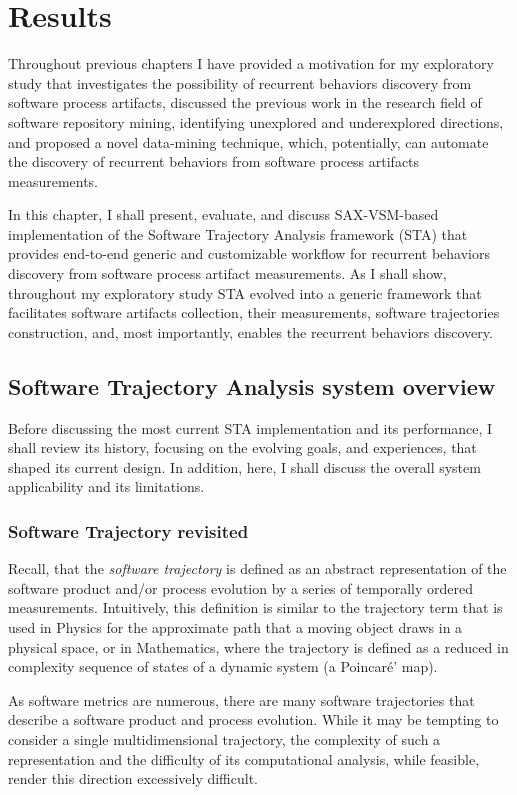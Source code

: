 \chapter{Results}\label{chapter_sta}
Throughout previous chapters I have provided a motivation for my exploratory study that investigates the possibility of recurrent 
behaviors discovery from software process artifacts, discussed the previous work in the research field of software repository mining,
identifying unexplored and underexplored directions, and proposed a novel data-mining technique, which, potentially, can automate 
the discovery of recurrent behaviors from software process artifacts measurements.

In this chapter, I shall present, evaluate, and discuss \mbox{SAX-VSM}-based implementation of the Software Trajectory Analysis 
framework (STA) that provides end-to-end generic and customizable workflow for recurrent behaviors discovery from software process 
artifact measurements. 
As I shall show, throughout my exploratory study STA evolved into a generic framework that facilitates software artifacts 
collection, their measurements, software trajectories construction, and, most importantly, 
enables the recurrent behaviors discovery.

\section{Software Trajectory Analysis system overview}
Before discussing the most current STA implementation and its performance, I shall review its history, focusing on 
the evolving goals, and experiences, that shaped its current design. In addition, here, I shall discuss the overall system
applicability and its limitations.

\subsection{Software Trajectory revisited}
Recall, that the \textit{software trajectory} is defined as an abstract representation of the software product and/or
process evolution by a series of temporally ordered measurements. 
Intuitively, this definition is similar to the trajectory term that is used in Physics for the 
approximate path that a moving object draws in a physical space, or in Mathematics, where the trajectory is defined as a reduced 
in complexity sequence of states of a dynamic system (a Poincar\'{e}' map).

As software metrics are numerous, there are many software trajectories that describe a software product and process 
evolution. While it may be tempting to consider a single multidimensional trajectory, the complexity of such a representation 
and the difficulty of its computational analysis, while feasible, render this direction excessively difficult.

